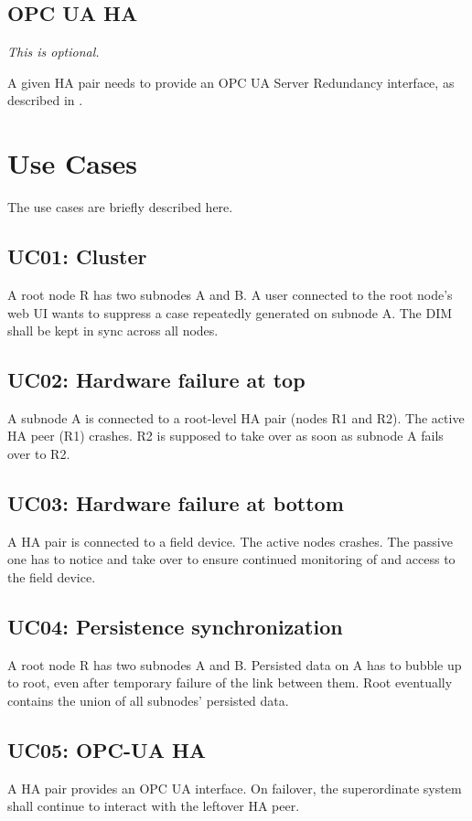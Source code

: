 \subsection{OPC UA HA}
\emph{This is optional.}

A given \gls{HA} pair needs to provide an OPC UA Server Redundancy interface,
as described in \cite[6.4.2.4 Non-transparent Redundancy,
p.~96]{opc-ua:behavior:server-redundancy}.

\section{Use Cases}
The use cases are briefly described here.

\subsection{UC01: Cluster}
A root node R has two subnodes A and B. A user connected to the root node's web
UI wants to suppress a case repeatedly generated on subnode A. The DIM shall be
kept in sync across all nodes.

\subsection{UC02: Hardware failure at top}
A subnode A is connected to a root-level HA pair (nodes R1 and R2). The active
HA peer (R1) crashes. R2 is supposed to take over as soon as subnode A fails
over to R2.

\subsection{UC03: Hardware failure at bottom}
A HA pair is connected to a field device. The active nodes crashes. The passive
one has to notice and take over to ensure continued monitoring of and access to
the field device.

\subsection{UC04: Persistence synchronization}
A root node R has two subnodes A and B. Persisted data on A has to bubble up to
root, even after temporary failure of the link between them. Root eventually
contains the union of all subnodes' persisted data.

\subsection{UC05: OPC-UA HA}
A HA pair provides an OPC UA interface. On failover, the superordinate system
shall continue to interact with the leftover HA peer.

